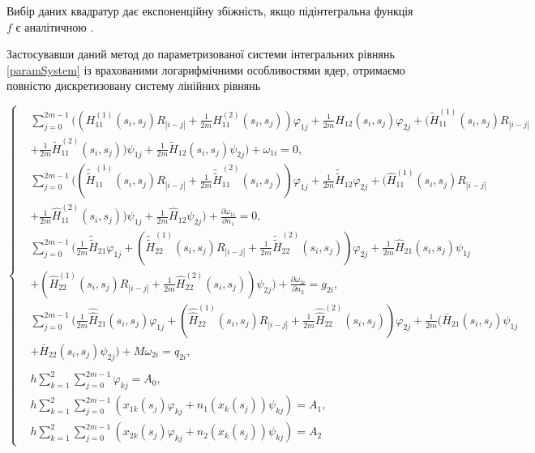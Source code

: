 \documentclass[12pt]{report}
\begin{document}
Вибір даних квадратур дає експоненційну збіжність, якщо підінтегральна функція $f$ є аналітичною \cite{kress}.

Застосувавши даний метод до параметризованої системи інтегральних рівнянь \eqref{paramSystem} із врахованими логарифмічними особливостями ядер, отримаємо повністю дискретизовану систему лінійних рівнянь

  \begin{equation} 
  \label{discreteSystem}
  \left\{
  \begin{split}
  	&\sum_{j=0}^{2m-1}\bigg((H^{(1)}_{11}(s_i, s_j)R_{|i-j|}+\frac{1}{2m}H^{(2)}_{11}(s_i, s_j))\varphi_{1j}+\frac{1}{2m}H_{12}(s_i, s_j)\varphi_{2j} +(\tilde{H}^{(1)}_{11}(s_i, s_j)R_{|i-j|} \\
	&+\frac{1}{2m}\tilde{H}^{(2)}_{11}(s_i, s_j))\psi_{1j}+\frac{1}{2m}\tilde{H}_{12}(s_i, s_j)\psi_{2j}\bigg) + \omega_{1i}=0, \\
	 &\sum_{j=0}^{2m-1}\bigg((\tilde{\tilde{H}}^{(1)}_{11}(s_i, s_j)R_{|i-j|}+\frac{1}{2m}\tilde{\tilde{H}}^{(2)}_{11}(s_i, s_j))\varphi_{1j} +\frac{1}{2m}\tilde{\tilde{H}}_{12}\varphi_{2j}+(\hat{H}^{(1)}_{11}(s_i, s_j)R_{|i-j|}\\
	 &+\frac{1}{2m}\hat{H}^{(2)}_{11}(s_i, s_j))\psi_{1j}+\frac{1}{2m}\hat{H}_{12}\psi_{2j}\bigg) +\frac{\partial\omega_{1i}}{\partial n_1}=0,\\
	 &\sum_{j=0}^{2m-1}\bigg(\frac{1}{2m}\tilde{\tilde{H}}_{21}\varphi_{1j}+(\tilde{\tilde{H}}^{(1)}_{22}(s_i, s_j)R_{|i-j|}+\frac{1}{2m}\tilde{\tilde{H}}^{(2)}_{22}(s_i, s_j))\varphi_{2j} + \frac{1}{2m}\hat{H}_{21}(s_i, s_j)\psi_{1j}\\
	 &+(\hat{H}^{(1)}_{22}(s_i, s_j)R_{|i-j|}+\frac{1}{2m}\hat{H}^{(2)}_{22}(s_i, s_j))\psi_{2j}\bigg) +\frac{\partial\omega_{2i}}{\partial n_2}=g_{2i},\\
	 &\sum_{j=0}^{2m-1}\bigg(\frac{1}{2m}\hat{\hat{H}}_{21}(s_i, s_j)\varphi_{1j}+(\hat{\hat{H}}^{(1)}_{22}(s_i, s_j)R_{|i-j|}+\frac{1}{2m}\hat{\hat{H}}^{(2)}_{22}(s_i, s_j))\varphi_{2j} + \frac{1}{2m}(\bar{H}_{21}(s_i, s_j)\psi_{1j}\\
	 &+\bar{H}_{22}(s_i, s_j)\psi_{2j}) +M\omega_{2i}=q_{2i},\\
	 & \\
	 &h\sum_{k=1}^{2}\sum_{j=0}^{2m-1}\varphi_{kj}=A_0, \\
	 &h\sum_{k=1}^{2}\sum_{j=0}^{2m-1}(x_{1k}(s_j)\varphi_{kj}+n_1(x_k(s_j))\psi_{kj})=A_1, \\
	 &h\sum_{k=1}^{2}\sum_{j=0}^{2m-1}(x_{2k}(s_j)\varphi_{kj}+n_2(x_k(s_j))\psi_{kj})=A_2
\end{split}
\right.
\end{equation}
\end{document}
